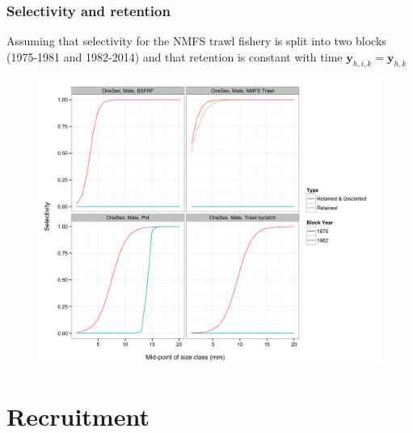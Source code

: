 \documentclass{beamer}
\begin{document}
\begin{frame}
\frametitle{Selectivity and retention}
Assuming that selectivity for the NMFS trawl fishery is split into two blocks
(1975-1981 and 1982-2014) and that retention is constant with time
$\boldsymbol{y}_{h,i,k} = \boldsymbol{y}_{h,k}$
\begin{figure}[!htbp]
  \centering
  \includegraphics[width=0.6\linewidth]{../../examples/bbrkc/OneSex/figure/selectivity.png}
\end{figure}
\end{frame}


\section{Recruitment}

\end{document}
